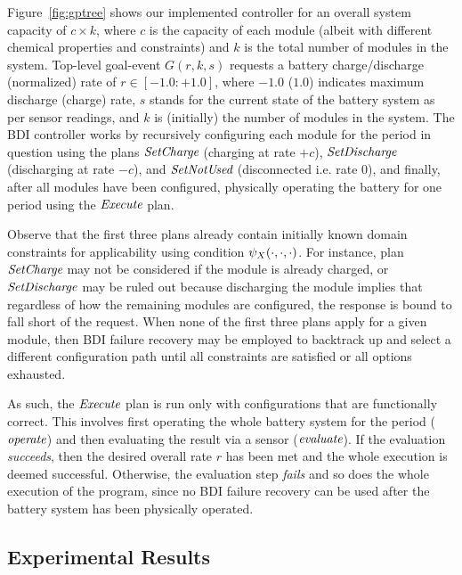 Figure~\ref{fig:gptree} shows our implemented controller for an overall system capacity of $c \times k$, where $c$ is the capacity of each module (albeit with different chemical properties and constraints) and $k$ is the total number of modules in the system. Top-level goal-event $G(r,k,s)$ requests a battery charge/discharge (normalized) rate of $r \in [-1.0:+1.0]$, where $-1.0$ ($1.0$) indicates maximum discharge (charge) rate, $s$ stands for the current state of the battery system as per sensor readings, and $k$ is (initially) the number of modules in the system. 
The BDI controller works by recursively configuring each module for the period in question using the plans $\operatorname{\textit{SetCharge}}$ (charging at rate $+c$), $\operatorname{\textit{SetDischarge}}$ (discharging at rate $-c$), and $\operatorname{\textit{SetNotUsed}}$ (disconnected i.e. rate $0$), and finally, after all modules have been configured, physically operating the battery for one period using the $\operatorname{\textit{Execute}}$ plan. 

Observe that the first three plans already contain initially known domain constraints for applicability using condition $\psi_X(\cdot,\cdot,\cdot)$. For instance, plan $\operatorname{\textit{SetCharge}}$ may not be considered if the module is already charged, or $\operatorname{\textit{SetDischarge}}$ may be ruled out because discharging the module implies that regardless of how the remaining modules are configured, the response is bound to fall short of the request. When none of the first three plans apply for a given module, then BDI failure recovery may be employed to backtrack up and select a different configuration path until all constraints are satisfied or all options exhausted. 

As such, the $\operatorname{\textit{Execute}}$ plan is run only with configurations that are functionally correct. This involves first operating the whole battery system for the period ($\operatorname{\textit{operate}}$) and then evaluating the result via a sensor ($\operatorname{\textit{evaluate}}$). If the evaluation \emph{succeeds}, then the desired overall rate $r$ has been met and the whole execution is deemed successful. Otherwise, the evaluation step \emph{fails} and so does the whole execution of the program, since no BDI failure recovery can be used after the battery system has been physically operated. 


\subsection{Experimental Results}\label{sec:results}

